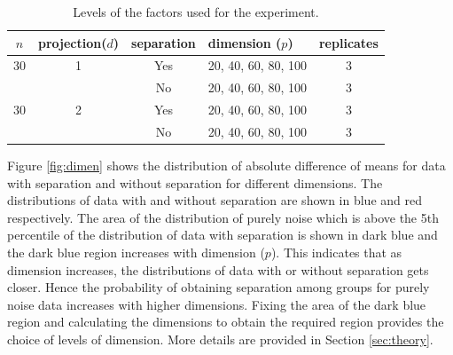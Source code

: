 \begin{table}[htbp]
\begin{center}
\caption{Levels of the factors used for the experiment.}
\begin{tabular}{cccp{2.2cm}|c}
  \hline
  \hline
  $n$ & projection($d$) & separation & dimension ($p$) & replicates\\
  \hline
  30 & 1 & Yes & 20, 40, 60, 80, 100 & 3 \\
      & & No & 20, 40, 60, 80, 100 & 3\\
   30 & 2 & Yes & 20, 40, 60, 80, 100 & 3 \\
     & & No & 20, 40, 60, 80, 100 & 3\\   
      \hline
\end{tabular}
\label{freq}
\end{center}
\end{table} 

Figure \ref{fig:dimen} shows the distribution of absolute difference of means for data with separation and without separation for different dimensions. The distributions of data with and without separation are shown in blue and red respectively. The area of the distribution of purely noise which is above the 5th percentile of the distribution of data with separation is shown in dark blue and the dark blue region increases with dimension ($p$). This indicates that as dimension increases, the distributions of data with or without separation gets closer. Hence the probability of obtaining separation among groups for purely noise data increases with higher dimensions. Fixing the area of the dark blue region and calculating the dimensions to obtain the required region provides the choice of levels of dimension. More details are provided in Section \ref{sec:theory}. 

